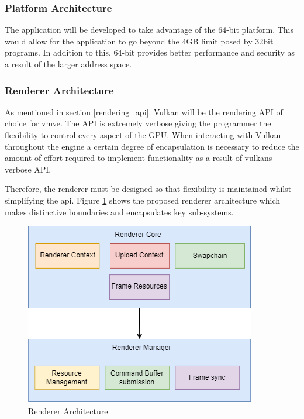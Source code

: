 \documentclass[11pt]{article}
\begin{document}
\subsubsection{Platform Architecture}
The application will be developed to take advantage of the 64-bit platform. This
would allow for the application to go beyond the 4GB limit posed by 32bit
programs. In addition to this, 64-bit provides better performance and security 
as a result of the larger address space.

\subsubsection{Renderer Architecture}
As mentioned in section \ref{rendering_api}. Vulkan will be the rendering API of
choice for \gls*{vmve}. The API is extremely verbose giving the programmer the
flexibility to control every aspect of the GPU. When interacting with Vulkan
throughout the engine a certain degree of encapsulation is necessary to reduce
the amount of effort required to implement functionality as a result of
\glspl*{vulkan} verbose API.

Therefore, the renderer must be designed so that flexibility is maintained
whilst simplifying the \gls{api}. Figure \ref{fig:rendererarch} shows the
proposed renderer architecture which makes distinctive boundaries and
encapsulates key sub-systems.

\begin{figure}[H]
  \centering
  \includegraphics[width=\textwidth]{images/renderer_architecture.png}
  \caption{Renderer Architecture}
  \label{fig:rendererarch}
\end{figure}
\end{document}
